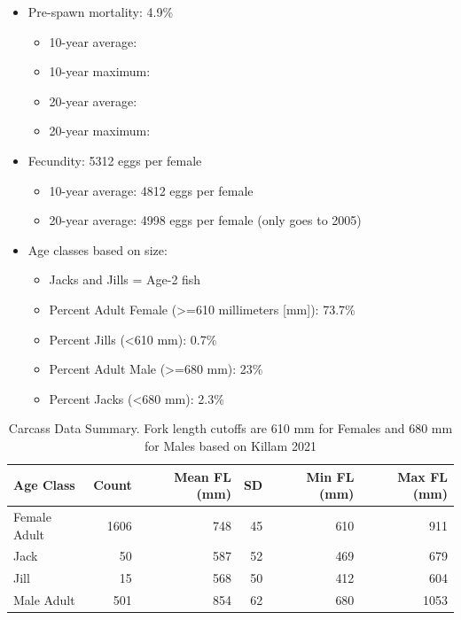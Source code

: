 \documentclass[
]{book}
\providecommand{\tightlist}{%
  \setlength{\itemsep}{0pt}\setlength{\parskip}{0pt}}
\theoremstyle{definition}
\theoremstyle{definition}
\theoremstyle{definition}
\theoremstyle{definition}
\theoremstyle{remark}
\begin{document}
\begin{itemize}
\tightlist
\item
  Pre-spawn mortality: 4.9\%

  \begin{itemize}
  \tightlist
  \item
    10-year average:
  \item
    10-year maximum:
  \item
    20-year average:
  \item
    20-year maximum:
  \end{itemize}
\item
  Fecundity: 5312 eggs per female

  \begin{itemize}
  \tightlist
  \item
    10-year average: 4812 eggs per female
  \item
    20-year average: 4998 eggs per female (only goes to 2005)
  \end{itemize}
\item
  Age classes based on size:

  \begin{itemize}
  \tightlist
  \item
    Jacks and Jills = Age-2 fish
  \item
    Percent Adult Female (\textgreater=610 millimeters {[}mm{]}): 73.7\%
  \item
    Percent Jills (\textless610 mm): 0.7\%
  \item
    Percent Adult Male (\textgreater=680 mm): 23\%
  \item
    Percent Jacks (\textless680 mm): 2.3\%
  \end{itemize}
\end{itemize}

\begin{table}
\centering
\caption{Carcass Data Summary. Fork length cutoffs are 610 mm for Females and 680 mm for Males based on Killam 2021}
\centering
\begin{tabular}[t]{lrrrrr}
\hline
Age Class & Count & Mean FL (mm) & SD & Min FL (mm) & Max FL (mm)\\
\hline
Female Adult & 1606 & 748 & 45 & 610 & 911\\
\hline
Jack & 50 & 587 & 52 & 469 & 679\\
\hline
Jill & 15 & 568 & 50 & 412 & 604\\
\hline
Male Adult & 501 & 854 & 62 & 680 & 1053\\
\hline
\end{tabular}
\end{table}
\end{document}
